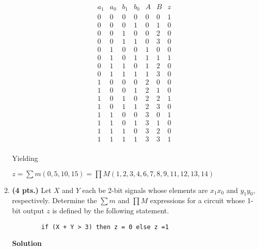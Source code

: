 \begin{enumerate}
\begin{onlysolution}
            $$
            \begin{array}{c|c|c|c||c|c||c}
                a_1 & a_0 & b_1 & b_0 & A  & B & z  \\ \hline
                0 & 0 & 0 & 0 & 0 & 0 & 1  \\ \hline
                0 & 0 & 0 & 1 & 0 & 1 & 0  \\ \hline
                0 & 0 & 1 & 0 & 0 & 2 & 0  \\ \hline
                0 & 0 & 1 & 1 & 0 & 3 & 0  \\ \hline
                0 & 1 & 0 & 0 & 1 & 0 & 0  \\ \hline
                0 & 1 & 0 & 1 & 1 & 1 & 1  \\ \hline
                0 & 1 & 1 & 0 & 1 & 2 & 0  \\ \hline
                0 & 1 & 1 & 1 & 1 & 3 & 0  \\ \hline
                1 & 0 & 0 & 0 & 2 & 0 & 0  \\ \hline
                1 & 0 & 0 & 1 & 2 & 1 & 0  \\ \hline
                1 & 0 & 1 & 0 & 2 & 2 & 1  \\ \hline
                1 & 0 & 1 & 1 & 2 & 3 & 0  \\ \hline
                1 & 1 & 0 & 0 & 3 & 0 & 1  \\ \hline
                1 & 1 & 0 & 1 & 3 & 1 & 0  \\ \hline
                1 & 1 & 1 & 0 & 3 & 2 & 0  \\ \hline
                1 & 1 & 1 & 1 & 3 & 3 & 1  \\
            \end{array}$$

            Yielding

            $z = \sum m(0,5,10,15) = \prod M(1,2,3,4,6,7,8,9,11,12,13,14)$
        \end{onlysolution}

    \item \textbf{ (4 pts.)} Let $X$ and $Y$ each be 2-bit signals whose
        elements are $x_1 x_0$ and $y_1 y_0$, respectively.  Determine the
        $\sum m$ and $\prod M$ expressions for a circuit whose 1-bit
        output $z$ is defined by the following statement.
\begin{verbatim}
        if (X + Y > 3) then z = 0 else z =1
\end{verbatim}

        \begin{onlysolution}  \textbf{Solution} \itshape


\end{onlysolution}
\end{enumerate}
